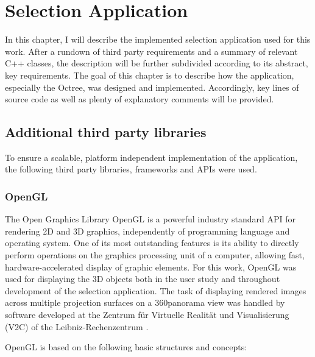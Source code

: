 \chapter{Selection Application}
\label{sec:selection_application}

In this chapter, I will describe the implemented selection application used for this work. After a rundown of third party requirements and a summary of relevant C++ classes, the description will be further subdivided according to its abstract, key requirements.
The goal of this chapter is to describe how the application, especially the Octree\cite{Octree}, was designed and implemented. Accordingly, key lines of source code as well as plenty of explanatory comments will be provided.

\section{Additional third party libraries}
\label{sec:additional_third_party_libraries}


To ensure a scalable, platform independent implementation of the application, the following third party libraries, frameworks and APIs were used.

\subsection{OpenGL}
\label{sec:opengl}

The Open Graphics Library OpenGL \cite{OpenGL} is a powerful industry standard API for rendering 2D and 3D graphics, independently of programming language and operating system. One of its most outstanding features is its ability to directly perform operations on the graphics processing unit of a computer, allowing fast, hardware-accelerated display of graphic elements. For this work, OpenGL was used for displaying the 3D objects both in the user study and throughout development of the selection application. The task of displaying rendered images across multiple projection surfaces on a 360\degree panorama view was handled by software developed at the Zentrum f\"ur Virtuelle Realit\"at und Visualisierung (V2C) of the Leibniz-Rechenzentrum \cite{v2c}.

OpenGL is based on the following basic structures and concepts:

